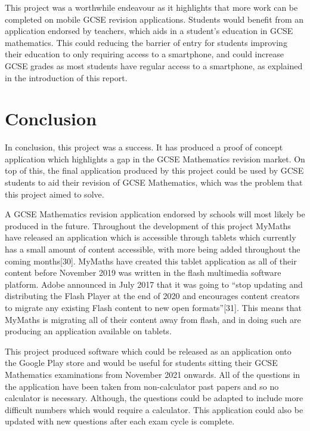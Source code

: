 \documentclass{article}
\begin{document}
This project was a worthwhile endeavour as it highlights that more work can be completed on mobile GCSE revision applications. Students would benefit from an application endorsed by teachers, which aids in a student's education in GCSE mathematics. This could reducing the barrier of entry for students improving their education to only requiring access to a smartphone, and could increase GCSE grades as most students have regular access to a smartphone, as explained in the introduction of this report. \par

\section{Conclusion}
\label{section:conclusion}

In conclusion, this project was a success. It has produced a proof of concept application which highlights a gap in the GCSE Mathematics revision market. On top of this, the final application produced by this project could be used by GCSE students to aid their revision of GCSE Mathematics, which was the problem that this project aimed to solve. \par

A GCSE Mathematics revision application endorsed by schools will most likely be produced in the future. Throughout the development of this project MyMaths have released an application which is accessible through tablets which currently has a small amount of content accessible, with more being added throughout the coming months[30]. MyMaths have created this tablet application as all of their content before November 2019 was written in the flash multimedia software platform. Adobe announced in July 2017 that it was going to ``stop updating and distributing the Flash Player at the end of 2020 and encourages content creators to migrate any existing Flash content to new open formats''[31]. This means that MyMaths is migrating all of their content away from flash, and in doing such are producing an application available on tablets. \par

This project produced software which could be released as an application onto the Google Play store and would be useful for students sitting their GCSE Mathematics examinations from November 2021 onwards. All of the questions in the application have been taken from non-calculator past papers and so no calculator is necessary. Although, the questions could be adapted to include more difficult numbers which would require a calculator. This application could also be updated with new questions after each exam cycle is complete. \par
\end{document}
